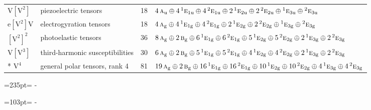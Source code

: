 \documentclass[10pt,a4paper]{article}
\newcommand{\needspace}[1]{\par\penalty-100\begingroup\dimen0=#1\relax\dimen2=\pagegoal
  \advance\dimen2-\pagetotal\ifdim\dimen0>\dimen2\relax\ifdim\dimen2>0pt\vfil\break\fi\fi
  \endgroup}
\numberwithin{equation}{section}
\newcommand{\irr}[1]{\text{\normalfont\scshape #1}}
\newcommand{\conjpair}[1]{{}^{#1}}
\newcommand{\ptag}[1]{\mathrm{#1}}
\newcommand{\jahn}[1]{\mathrm{#1}}
\newlength{\fillwidth}\newlength{\cellwidth}\newlength{\colwidth}
\begin{document}
{\begin{longtable}{@{}llr>{\RaggedRight\arraybackslash}p{\fillwidth}@{}}
$\jahn{V[V^{2}]}$ & piezoelectric tensors & 18 & $4\,\irr{a}_{\ptag{u}} \oplus\allowbreak 4\,\conjpair{1}\irr{e}_{1\ptag{u}} \oplus\allowbreak 4\,\conjpair{2}\irr{e}_{1\ptag{u}} \oplus\allowbreak 2\,\conjpair{1}\irr{e}_{2\ptag{u}} \oplus\allowbreak 2\,\conjpair{2}\irr{e}_{2\ptag{u}} \oplus\allowbreak \conjpair{1}\irr{e}_{3\ptag{u}} \oplus\allowbreak \conjpair{2}\irr{e}_{3\ptag{u}}$\\
$\jahn{e[V^{2}]V}$ & electrogyration tensors & 18 & $4\,\irr{a}_{\ptag{g}} \oplus\allowbreak 4\,\conjpair{1}\irr{e}_{1\ptag{g}} \oplus\allowbreak 4\,\conjpair{2}\irr{e}_{1\ptag{g}} \oplus\allowbreak 2\,\conjpair{1}\irr{e}_{2\ptag{g}} \oplus\allowbreak 2\,\conjpair{2}\irr{e}_{2\ptag{g}} \oplus\allowbreak \conjpair{1}\irr{e}_{3\ptag{g}} \oplus\allowbreak \conjpair{2}\irr{e}_{3\ptag{g}}$\\
$\jahn{[V^{2}]^{2}}$ & photoelastic tensors & 36 & $8\,\irr{a}_{\ptag{g}} \oplus\allowbreak 2\,\irr{b}_{\ptag{g}} \oplus\allowbreak 6\,\conjpair{1}\irr{e}_{1\ptag{g}} \oplus\allowbreak 6\,\conjpair{2}\irr{e}_{1\ptag{g}} \oplus\allowbreak 5\,\conjpair{1}\irr{e}_{2\ptag{g}} \oplus\allowbreak 5\,\conjpair{2}\irr{e}_{2\ptag{g}} \oplus\allowbreak 2\,\conjpair{1}\irr{e}_{3\ptag{g}} \oplus\allowbreak 2\,\conjpair{2}\irr{e}_{3\ptag{g}}$\\
$\jahn{V[V^{3}]}$ & third-harmonic susceptibilities & 30 & $6\,\irr{a}_{\ptag{g}} \oplus\allowbreak 2\,\irr{b}_{\ptag{g}} \oplus\allowbreak 5\,\conjpair{1}\irr{e}_{1\ptag{g}} \oplus\allowbreak 5\,\conjpair{2}\irr{e}_{1\ptag{g}} \oplus\allowbreak 4\,\conjpair{1}\irr{e}_{2\ptag{g}} \oplus\allowbreak 4\,\conjpair{2}\irr{e}_{2\ptag{g}} \oplus\allowbreak 2\,\conjpair{1}\irr{e}_{3\ptag{g}} \oplus\allowbreak 2\,\conjpair{2}\irr{e}_{3\ptag{g}}$\\*
$\jahn{V^{4}}$ & general polar tensors, rank 4 & 81 & $19\,\irr{a}_{\ptag{g}} \oplus\allowbreak 2\,\irr{b}_{\ptag{g}} \oplus\allowbreak 16\,\conjpair{1}\irr{e}_{1\ptag{g}} \oplus\allowbreak 16\,\conjpair{2}\irr{e}_{1\ptag{g}} \oplus\allowbreak 10\,\conjpair{1}\irr{e}_{2\ptag{g}} \oplus\allowbreak 10\,\conjpair{2}\irr{e}_{2\ptag{g}} \oplus\allowbreak 4\,\conjpair{1}\irr{e}_{3\ptag{g}} \oplus\allowbreak 4\,\conjpair{2}\irr{e}_{3\ptag{g}}$\\
\bottomrule\end{longtable}}
\needspace{235pt}
\needspace{103pt}
\end{document}
